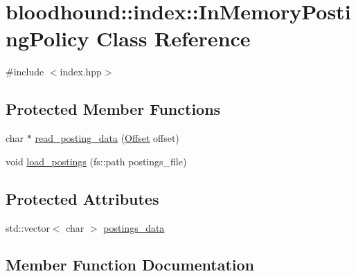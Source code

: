 \hypertarget{classbloodhound_1_1index_1_1InMemoryPostingPolicy}{}\section{bloodhound\+:\+:index\+:\+:In\+Memory\+Posting\+Policy Class Reference}
\label{classbloodhound_1_1index_1_1InMemoryPostingPolicy}


{\ttfamily \#include $<$index.\+hpp$>$}

\subsection*{Protected Member Functions}
\begin{DoxyCompactItemize}
\item 
char $\ast$ \mbox{\hyperlink{classbloodhound_1_1index_1_1InMemoryPostingPolicy_acc5567fd6ba17861290ba045567e7e1a}{read\+\_\+posting\+\_\+data}} (\mbox{\hyperlink{structbloodhound_1_1Offset}{Offset}} offset)
\item 
void \mbox{\hyperlink{classbloodhound_1_1index_1_1InMemoryPostingPolicy_a68a2a76f7b4349ade63f83acfd6a1dc5}{load\+\_\+postings}} (fs\+::path postings\+\_\+file)
\end{DoxyCompactItemize}
\subsection*{Protected Attributes}
\begin{DoxyCompactItemize}
\item 
std\+::vector$<$ char $>$ \mbox{\hyperlink{classbloodhound_1_1index_1_1InMemoryPostingPolicy_ae760569f621a8b6260cbc50c144be0bf}{postings\+\_\+data}}
\end{DoxyCompactItemize}


\subsection{Member Function Documentation}
\mbox{\label{classbloodhound_1_1index_1_1InMemoryPostingPolicy_a68a2a76f7b4349ade63f83acfd6a1dc5}} 
